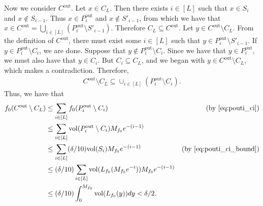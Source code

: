 \documentclass[final,12pt]{colt2018}
\newtheorem{informal theorem}[theorem]{Theorem (informal statement)}
\newcommand{\pouti}{P^{\mathrm{out}}_i}
\newcommand{\cout}{C^\mathrm{out}}
\newcommand{\vol}{\mathrm{vol}}
\begin{document}
Now we consider $\cout$.
Let $x \in C_L$. Then there exists $i \in [L]$ such that $x \in S_i$ and $x \notin S_{i-1}$.
Thus $x \in \pouti$ and $x \notin S'_{i-1}$, from which we have that $x \in \cout = \bigcup_{i \in [L]} (\pouti \setminus S'_{i-1})$. Therefore $C_L \subseteq \cout$.
Let $y \in \cout \setminus C_L$. 
From the definition of $\cout$, there must exist some $i \in [L]$ such that $y \in \pouti \setminus S'_{i-1}$. If $y \in \pouti \setminus C_i$, we are done. Suppose that $y \notin \pouti \setminus C_i$. Since we have that $y \in \pouti$, we must also have that $y \in C_i$. But $C_i \subseteq C_L$, and we began with $y \in \cout \setminus C_L$, which makes a contradiction. Therefore,
\begin{align}
\cout \setminus C_L \subseteq \cup_{i \in [L]} \left(\pouti \setminus C_i\right). \label{eq:pouti_ci}
\end{align}
Thus, we have that
\begin{align}
f_0(\cout \setminus C_L)
&\leq \sum_{i \in [L]} f_0(\pouti \setminus C_i) & \text{(by \eqref{eq:pouti_ci})} \notag \\
&\leq \sum_{i \in [L]} \vol(\pouti \setminus C_i) M_{f_0} e^{-(i-1)} \notag \\
&\leq \sum_{i \in [L]} (\delta/10) \vol(S_i) M_{f_0} e^{-(i-1)} &\text{(by \eqref{eq:pouti_ci_bound})} \notag \\
&\leq (\delta/10) \sum_{i \in [L]} \vol(L_{f_0}(M_{f_0} e^{-i})) M_{f_0} e^{-(i-1)} \notag \\
&\leq (\delta/10) \int_0^{M_{f_0}} \vol(L_{f_0}(y)) dy < \delta / 2. \label{eq:imp_f0_Tp_Cp}
\end{align}
\end{document}
